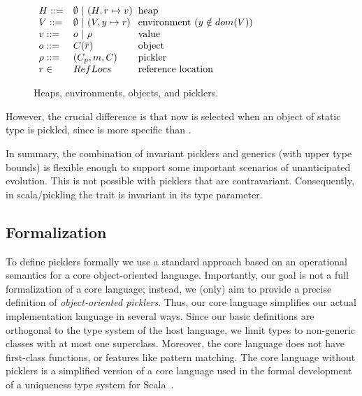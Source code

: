 \begin{figure}[ht!]

$\ba[t]{ll@{\hspace{2mm}}l}
H    ::= & \emptyset ~|~ (H, r \mapsto v)              & \mbox{heap} \\
V    ::= & \emptyset ~|~ (V, y \mapsto r)              & \mbox{environment}~(y \notin dom(V)) \\
v    ::= & o ~|~ \rho                                  & \mbox{value} \\
o    ::= & C(\seq{r})                                  & \mbox{object} \\
\rho ::= & (C_p, m, C)                                 & \mbox{pickler} \\
r \in    & RefLocs                                     & \mbox{reference location}
\ea$

\caption{Heaps, environments, objects, and picklers.}\label{fig:heaps-stacks}
\end{figure}

However, the crucial difference is that now  is selected when
an object of static type  is pickled, since  is more
specific than .

In summary, the combination of invariant picklers and generics (with upper
type bounds) is flexible enough to support some important scenarios of
unanticipated evolution. This is not possible with picklers that are
contravariant. Consequently, in scala/pickling the  trait is
invariant in its type parameter.

\subsection{Formalization}\label{sub:picklers-formal}

To define picklers formally we use a standard approach based on an operational
semantics for a core object-oriented language. Importantly, our goal is not a
full formalization of a core language; instead, we (only) aim to provide a
precise definition of {\em object-oriented picklers}. Thus, our core language
simplifies our actual implementation language in several ways. Since our basic
definitions are orthogonal to the type system of the host language, we limit
types to non-generic classes with at most one superclass. Moreover, the core
language does not have first-class functions, or features like pattern
matching. The core language without picklers is a simplified version of a core
language used in the formal development of a uniqueness type system for
Scala~\cite{HallerO10}.


